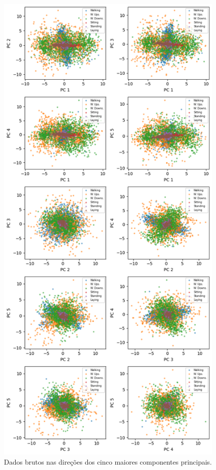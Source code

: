 \documentclass[final,5p]{elsarticle}
\numberwithin{equation}{section}
\begin{document}
        \begin{figure}[hbt!]
            \includegraphics[width=0.95\columnwidth]{C_PrincipalComponents_Raw.png}
            \caption{Dados brutos nas direções dos cinco maiores componentes principais.}
            \label{fig:pc_brutos}
        \end{figure}
\end{document}

